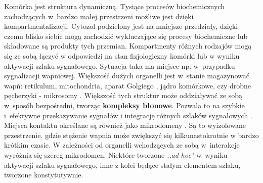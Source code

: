 Komórka jest struktura dynamiczną. Tysiące procesów biochemicznych zachodzących w~bardzo małej przestrzeni możliwe jest dzięki kompartmentalizacji. Cytozol podzielony jest na mniejsze przedziały, dzięki czemu blisko siebie mogą zachodzić wykluczające się procesy biochemiczne lub składowane są produkty tych przemian. Kompartmenty różnych rodzajów mogą się ze sobą łączyć w odpowiedzi na stan fizjologiczny komórki lub w wyniku aktywacji szlaku sygnałowego. Sytuacja taka ma miejsce np. w~przypadku sygnalizacji wapniowej. Większość dużych organelli jest w~stanie magazynować wapń: retikulum, mitochondria, aparat Golgiego \cite{Micaroni2012}, jądro komórkowe\cite{Alonso2006}, czy drobne pęcherzyki - mikrosomy \cite{Neher1998}. Większość tych struktur może oddziaływać ze sobą w~sposób bezpośredni, tworząc \textbf{kompleksy błonowe}. Pozwala to na szybkie i~efektywne przekazywanie sygnałów i integrację różnych szlaków sygnałowych \cite{Laude2009,Petersen2002}. Miejsca kontaktu określane są również jako mikrodomeny \cite{Berridge2006,Rizzuto2006}. Są to wyizolowane przestrzenie, gdzie stężenie wapnia może zwiększyć się kilkunastokrotnie w bardzo krótkim czasie. W zależności od organelli wchodzących ze sobą w~interakcje wyróżnia się szereg mikrodomen. Niektóre tworzone \textit{,,ad hoc"} w~wyniku aktywacji szlaku sygnałowego, inne z kolei będące stałym elementem szlaku, tworzone konstytutywnie.


